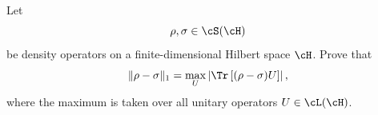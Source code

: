 Let
$$
\rho,\sigma\in \cS(\cH)
$$
be density operators on a finite-dimensional Hilbert space $\cH$. Prove that
$$
\|\rho-\sigma\|_1
=
\max_{U}
\left|
\Tr\left[(\rho-\sigma)U\right]
\right|,
$$
where the maximum is taken over all unitary operators $U\in \cL(\cH)$.

